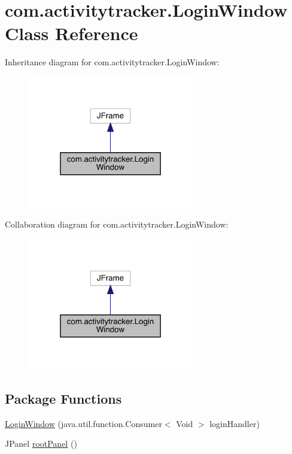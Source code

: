 \hypertarget{classcom_1_1activitytracker_1_1_login_window}{}\section{com.\+activitytracker.\+Login\+Window Class Reference}
\label{classcom_1_1activitytracker_1_1_login_window}


Inheritance diagram for com.\+activitytracker.\+Login\+Window\+:
\nopagebreak
\begin{figure}[H]
\begin{center}
\leavevmode
\includegraphics[width=205pt]{classcom_1_1activitytracker_1_1_login_window__inherit__graph}
\end{center}
\end{figure}


Collaboration diagram for com.\+activitytracker.\+Login\+Window\+:
\nopagebreak
\begin{figure}[H]
\begin{center}
\leavevmode
\includegraphics[width=205pt]{classcom_1_1activitytracker_1_1_login_window__coll__graph}
\end{center}
\end{figure}
\subsection*{Package Functions}
\begin{DoxyCompactItemize}
\item 
\mbox{\hyperlink{classcom_1_1activitytracker_1_1_login_window_a137cce127ffa1660c70d3fddbc0e2a74}{Login\+Window}} (java.\+util.\+function.\+Consumer$<$ Void $>$ login\+Handler)
\item 
J\+Panel \mbox{\hyperlink{classcom_1_1activitytracker_1_1_login_window_ab1ea45e86bbb79bccd06531279f1e443}{root\+Panel}} ()
\end{DoxyCompactItemize}
